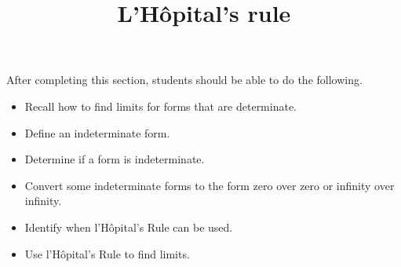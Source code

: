 \documentclass{ximera}
\title{L'H\^{o}pital's rule}
\begin{document}
\begin{abstract}
\end{abstract}

\maketitle

\begin{sectionOutcomes}

After completing this section, students should be able to do the following.

\begin{itemize}
	\item Recall how to find limits for forms that are determinate.
	\item Define an indeterminate form.
	\item Determine if a form is indeterminate.
	\item Convert some indeterminate forms to the form zero over zero
          or infinity over infinity.
	\item Identify when l'H\^{o}pital's Rule can be used.
	\item Use l'H\^{o}pital's Rule to find limits.
\end{itemize}

\end{sectionOutcomes}
\end{document}
